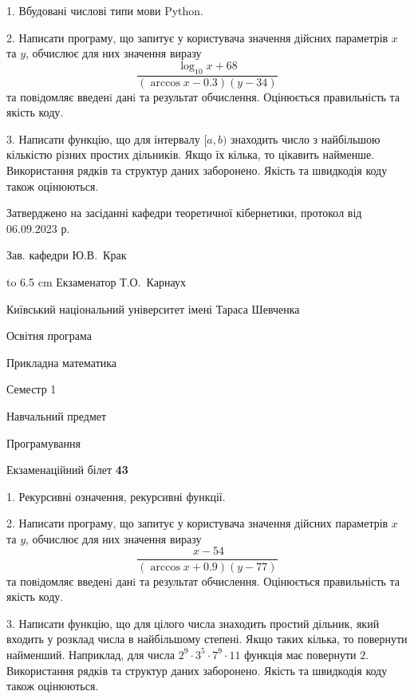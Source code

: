 \documentclass[12pt, ukrainian]{article}
\begin{document}
{%
1. Вбудовані числові типи мови Python.%
\par
2. Написати програму, що запитує у користувача значення дійсних параметрів $x$ та $y$, обчислює для них значення виразу 
$$\frac{\log_{10} x + 68}{(\arccos x - 0.3) (y - 34)}$$ 
та повiдомляє введенi данi та результат обчислення.
 Оцінюється правильність та якість коду.

\par
3. Написати функцію, що для інтервалу $[a, b)$ знаходить число з найбільшою кількістю різних простих дільників. Якщо їх кілька, то цікавить найменше.  Використання рядків та структур даних заборонено. Якість та швидкодія коду також оцінюються. 

}
{\smallskip\smallskip \begin {scriptsize} Затверджено на засіданні кафедри теоретичної кібернетики, протокол   від   06.09.2023 р.\par\smallskip\smallskip\smallskip\smallskip
{\parbox {6.5 cm} {Зав. кафедри \dotfill Ю.В.~Крак}}\hspace {0.7cm} {\hbox to 6.5 cm { Екзаменатор \dotfill Т.О.~Карнаух}} \end{scriptsize}}
\newpage
{{\begin {scriptsize}\par
{ \center  Київський національний університет імені Тараса Шевченка \par}
{\parbox {5 cm}{Освітня програма \hfill}{\parbox {7 cm}{Прикладна математика\hfill}}\parbox {6 cm}{\hfill Семестр 1}}\par
{\parbox {5 cm} {Навчальний предмет \hfill}\parbox {7 cm}{Програмування \hfill}\parbox {6cm}{\hfill}\par}\vspace{-15pt} \end{scriptsize}}{\center Екзаменаційний білет \No \textbf { 43 }\par}}
{%
1. Рекурсивні означення, рекурсивні функції.%
\par
2. Написати програму, що запитує у користувача значення дійсних параметрів $x$ та $y$, обчислює для них значення виразу 
$$\frac{\ x - 54}{(\arccos x + 0.9) (y - 77)}$$ 
та повiдомляє введенi данi та результат обчислення.
 Оцінюється правильність та якість коду.

\par
3. Написати функцію, що для цілого числа знаходить простий дільник, який входить у розклад числа в найбільшому степені. Якщо таких кілька, то повернути найменший. Наприклад, для числа $2^{9}{\cdot}3^5{\cdot}7^9{\cdot}11$ функція має повернути $2$.  Використання рядків та структур даних заборонено. Якість та швидкодія коду також оцінюються. 

}
\end{document}
